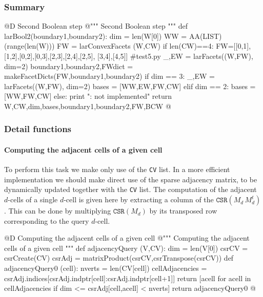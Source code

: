 \documentclass[11pt,oneside]{article}	%
\begin{document}
\subsubsection{Summary}

@D Second Boolean step
@{""" Second Boolean step """
def larBool2(boundary1,boundary2):
	dim = len(W[0])
	WW = AA(LIST)(range(len(W)))
	FW = larConvexFacets (W,CW)
	if len(CW)==4: FW=[[0,1],[1,2],[0,2],[0,3],[2,3],[2,4],[2,5],
						[3,4],[4,5]] #test5.py
	_,EW = larFacets((W,FW), dim=2)
	boundary1,boundary2,FWdict = makeFacetDicts(FW,boundary1,boundary2)
	if dim == 3: 
		_,EW = larFacets((W,FW), dim=2)
		bases = [WW,EW,FW,CW]
	elif dim == 2: bases = [WW,FW,CW]
	else: print "\nerror: not implemented\n"
	return W,CW,dim,bases,boundary1,boundary2,FW,BCW
@}

\subsubsection{Detail functions}


\paragraph{Computing the adjacent cells of a given cell}
To perform this task we make only use of the \texttt{CV} list. In a more efficient implementation we should make direct use of the sparse adjacency matrix, to be dynamically updated together with the \texttt{CV} list.
The computation of the adjacent $d$-cells of a single $d$-cell is given here by extracting a column of the $\texttt{CSR}(M_d\, M_d^t)$. This can be done by multiplying $\texttt{CSR}(M_d)$ by its transposed row corresponding to the query $d$-cell. 

@D Computing the adjacent cells of a given cell
@{""" Computing the adjacent cells of a given cell """
def adjacencyQuery (V,CV):
	dim = len(V[0])
	csrCV =  csrCreate(CV)
	csrAdj = matrixProduct(csrCV,csrTranspose(csrCV))
	def adjacencyQuery0 (cell):
		nverts = len(CV[cell])
		cellAdjacencies = csrAdj.indices[csrAdj.indptr[cell]:csrAdj.indptr[cell+1]]
		return [acell for acell in cellAdjacencies if dim <= csrAdj[cell,acell] < nverts]
	return adjacencyQuery0
@}
\end{document}
